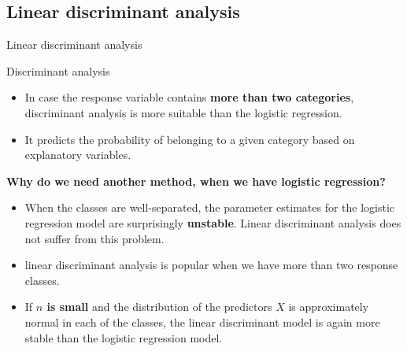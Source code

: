 \documentclass{beamer}
\begin{document}
\subsection{Linear discriminant analysis}

\begin{frame}
	\begin{center}
		\Large{\textcolor{dkblue}{Linear discriminant analysis}}
	\end{center}
\end{frame}


\begin{frame}{Discriminant analysis}
	\begin{itemize}
		\item
		In case the response variable contains \textbf{more than two categories}, discriminant analysis is more suitable than the logistic regression.
		\vspace{0.2cm}	
		\item
		It predicts the probability of belonging to a given category based on explanatory variables.
		\vspace{0.2cm}	
	\end{itemize}
\end{frame}


\begin{frame}{\textbf{Why do we need another method, when we have logistic regression?}}
	\begin{itemize}
		\item
		When the classes are well-separated, the parameter estimates for the
logistic regression model are surprisingly \textbf{unstable}. Linear discriminant
analysis does not suffer from this problem.
	\vspace{0.2cm}	  
		\item
		linear discriminant analysis is popular
when we have more than two response classes.
		\vspace{0.2cm}	
		\item
		If \textbf{$n$ is small} and the distribution of the predictors $X$ is approximately
normal in each of the classes, the linear discriminant model is again
more stable than the logistic regression model.
	\end{itemize}
\end{frame}
\end{document}

